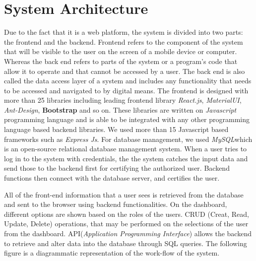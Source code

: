 \section{System Architecture}\label{sec:sa}
Due to the fact that it is a web platform, the system is divided into two parts: the frontend and the backend. Frontend refers to the component of the system that will be visible to the user on the screen of a mobile device or computer. Whereas the back end refers to parts of the system or a program's code that allow it to operate and that cannot be accessed by a user. The back end is also called the data access layer of a system and includes any functionality that needs to be accessed and navigated to by digital means. The frontend is designed with more than 25 libraries including leading frontend library \textit{React.js}, \textit{MaterialUI}, \textit{Ant-Design}, \textbf{Bootstrap} and so on. These libraries are written on \textit{Javascript} programming language and is able to be integrated with any other programming language based backend libraries. We used more than 15 Javascript based frameworks such as \textit{Express Js}. For database management, we used \textit{MySQL}\footnotemark which is an open-source relational database management system. When a user tries to log in to the system with credentials, the the system catches the input data and send those to the backend first for certifying the authorized user. Backend functions then connect with the database server, and certifies the user.

All of the front-end information that a user sees is retrieved from the database and sent to the browser using backend functionalities. On the dashboard, different options are shown based on the roles of the users. CRUD (Creat, Read, Update, Delete) operations, that may be performed on the selections of the user from the dashboard. API\footnotemark (\textit{Application Programming Interface}) allows the backend to retrieve and alter data into the database through SQL queries. The following figure is a diagrammatic representation of the work-flow of the system.



